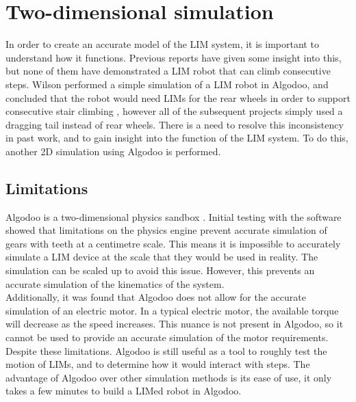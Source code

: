 \chapter{Two-dimensional simulation}

In order to create an accurate model of the LIM system, it is important to understand how it functions. Previous reports have given some insight into this, but none of them have demonstrated a LIM robot that can climb consecutive steps. Wilson performed a simple simulation of a LIM robot in Algodoo, and concluded that the robot would need LIMs for the rear wheels in order to support consecutive stair climbing \citep{Wilson-2013}, however all of the subsequent projects simply used a dragging tail instead of rear wheels. There is a need to resolve this inconsistency in past work, and to gain insight into the function of the LIM system. To do this, another 2D simulation using Algodoo is performed.

\section{Limitations}

Algodoo is a two-dimensional physics sandbox \citep{Algodoo}. Initial testing with the software showed that limitations on the physics engine prevent accurate simulation of gears with teeth at a centimetre scale. This means it is impossible to accurately simulate a LIM device at the scale that they would be used in reality. The simulation can be scaled up to avoid this issue. However, this prevents an accurate simulation of the kinematics of the system.\\

Additionally, it was found that Algodoo does not allow for the accurate simulation of an electric motor. In a typical electric motor, the available torque will decrease as the speed increases. This nuance is not present in Algodoo, so it cannot be used to provide an accurate simulation of the motor requirements. Despite these limitations. Algodoo is still useful as a tool to roughly test the motion of LIMs, and to determine how it would interact with steps. The advantage of Algodoo over other simulation methods is its ease of use, it only takes a few minutes to build a LIMed robot in Algodoo.



